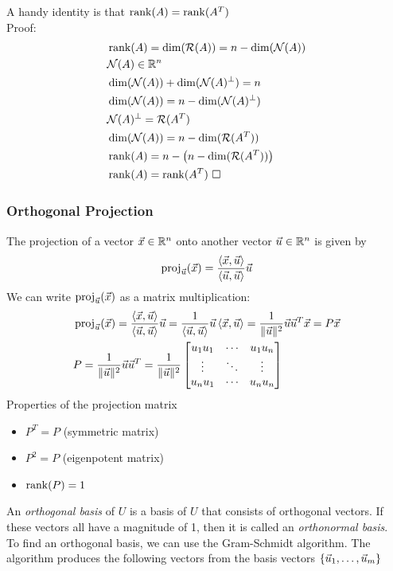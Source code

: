 \documentclass[11pt, fleqn]{article}
\begin{document}
A handy identity is that $\operatorname{rank}(A)=\operatorname{rank}(A^T)$\\
Proof:
\begin{align*}
    &\operatorname{rank}(A)=\dim(\mathcal{R}(A))=n-\dim(\mathcal{N}(A))\\
    &\mathcal{N}(A)\in\mathbb{R}^n\\
    &\dim(\mathcal{N}(A))+\dim(\mathcal{N}(A)^\perp)=n\\
    &\dim(\mathcal{N}(A))=n-\dim(\mathcal{N}(A)^\perp)\\
    &\mathcal{N}(A)^\perp=\mathcal{R}(A^T)\\
    &\dim(\mathcal{N}(A))=n-\dim(\mathcal{R}(A^T))\\
    &\operatorname{rank}(A)=n-\left( n-\dim(\mathcal{R}(A^T)) \right)\\
    &\operatorname{rank}(A)=\operatorname{rank}(A^T)\ \square
\end{align*}
\subsubsection{Orthogonal Projection}
The projection of a vector $\vec{x}\in\mathbb{R}^n$ onto another vector $\vec{u}\in\mathbb{R}^n$ is given by
$$\operatorname{proj}_{\vec{u}}(\vec{x})=\frac{\left\langle \vec{x},\vec{u} \right\rangle}{\left\langle \vec{u},\vec{u} \right\rangle}\vec{u}$$
We can write $\operatorname{proj}_{\vec{u}}(\vec{x})$ as a matrix multiplication:
\begin{align*}
    &\proj_{\vec{u}}(\vec{x})=\frac{\brangle{\vec{x},\vec{u}}}{\brangle{\vec{u},\vec{u}}}\vec{u}=\frac{1}{\brangle{\vec{u},\vec{u}}}\vec{u}\brangle{\vec{x},\vec{u}}=\frac{1}{\|\vec{u}\|^2}\vec{u}\vec{u}^T\vec{x}=P\vec{x}\\
    &P=\frac{1}{\|\vec{u}\|^2}\vec{u}\vec{u}^T=\frac{1}{\|\vec{u}\|^2}\matrixx{u_1u_1 & \cdots & u_1u_n\\ \vdots & \ddots & \vdots\\ u_nu_1 & \cdots & u_nu_n}
\end{align*}
Properties of the projection matrix
\begin{itemize}
    \item $P^T=P$ (symmetric matrix)
    \item $P^2=P$ (eigenpotent matrix)
    \item $\operatorname{rank}(P)=1$
\end{itemize}
An \textit{orthogonal basis} of $U$ is a basis of $U$ that consists of orthogonal vectors. If these vectors all have a magnitude of 1, then it is called an \textit{orthonormal basis}.\\
To find an orthogonal basis, we can use the Gram-Schmidt algorithm. The algorithm produces the following vectors from the basis vectors $\left\{ \vec{u}_1,\ldots,\vec{u}_m \right\}$
\end{document}
